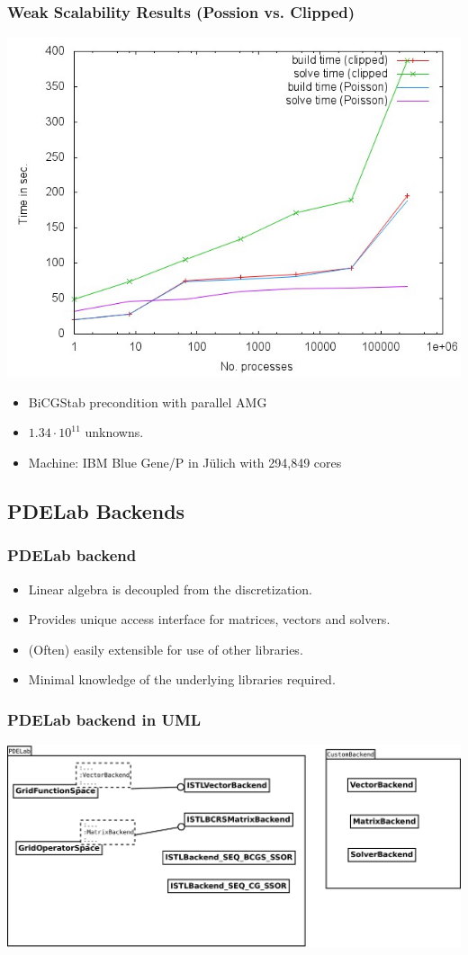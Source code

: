 \begin{frame}[fragile]
  \frametitle{Weak Scalability Results (Possion vs. Clipped)}
  \begin{center}
      \includegraphics[width=.6\textwidth]{EPS/solve_build.jpg}
  \end{center}
  \begin{itemize}
  \item BiCGStab precondition with parallel AMG 
  \item $1.34\cdot 10^{11}$ unknowns.
  \item Machine: IBM Blue Gene/P in J\"ulich with 294,849 cores
  \end{itemize}
\end{frame}
\subsection{PDELab Backends}
\label{sec:pdelab-backends-1}


\begin{frame}
  \frametitle<presentation>{PDELab backend}
  \begin{itemize}
  \item Linear algebra is decoupled from the discretization.
  \item Provides unique access interface for matrices, vectors and
    solvers.
  \item (Often) easily extensible for use of other libraries.
  \item Minimal knowledge of the underlying libraries required.
  \end{itemize}
\end{frame}

\begin{frame}
  \frametitle{PDELab backend in UML}
  \includegraphics[width=\textwidth]{./EPS/backend}
\end{frame}


